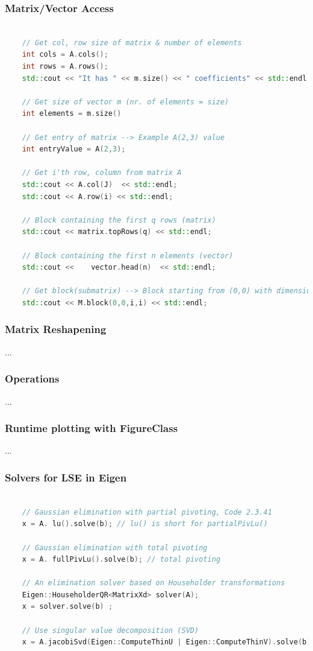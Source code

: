 \documentclass[12pt, a4paper]{article}
\begin{document}
\subsubsection{Matrix/Vector Access}
\begin{lstlisting}[language=C++, caption=matrix manipulation]
	
	// Get col, row size of matrix & number of elements
	int cols = A.cols();
	int rows = A.rows();
	std::cout << "It has " << m.size() << " coefficients" << std::endl;
	
	// Get size of vector m (nr. of elements = size)
	int elements = m.size()
		
	// Get entry of matrix --> Example A(2,3) value
	int entryValue = A(2,3);
	
	// Get i'th row, column from matrix A
	std::cout << A.col(J)  << std::endl;
	std::cout << A.row(i) << std::endl;
	
	// Block containing the first q rows (matrix)
	std::cout << matrix.topRows(q) << std::endl;
	
	// Block containing the first n elements (vector)
	std::cout <<	vector.head(n)	<< std::endl;
	
	// Get block(submatrix) --> Block starting from (0,0) with dimension ixi
	std::cout << M.block(0,0,i,i) << std::endl;
\end{lstlisting}


\subsubsection{Matrix Reshapening}
...

\subsubsection{Operations}
...

\subsubsection{Runtime plotting with FigureClass}
...

\subsubsection{Solvers for LSE in Eigen }
	\begin{lstlisting}[language=C++, caption=LSE solvers]
	
	// Gaussian elimination with partial pivoting, Code 2.3.41
	x = A. lu().solve(b); // lu() is short for partialPivLu()
	
	// Gaussian elimination with total pivoting
	x = A. fullPivLu().solve(b); // total pivoting
	
	// An elimination solver based on Householder transformations		
	Eigen::HouseholderQR<MatrixXd> solver(A);
	x = solver.solve(b) ;	
	
	// Use singular value decomposition (SVD)	
	x = A.jacobiSvd(Eigen::ComputeThinU | Eigen::ComputeThinV).solve(b);	
		
	\end{lstlisting}
\end{document}
